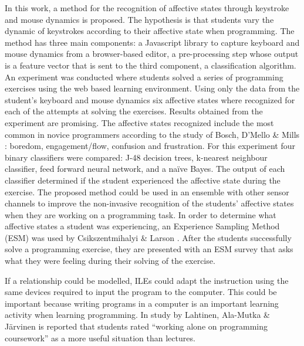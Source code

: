 \documentclass[conference]{IEEEtran}
\begin{document}
In this work, a method for the recognition of affective states through keystroke
and mouse dynamics is proposed. The hypothesis is that students vary the dynamic
of keystrokes according to their affective state when programming. 
 The method
has three main components: a Javascript library to capture keyboard and mouse
dynamics from a browser-based editor, a pre-processing step whose output is a
feature vector that is sent to the third component, a classification algorithm.
An experiment was conducted where students solved a series of programming
exercises using the web based learning environment. Using only the data from the
student’s keyboard and mouse dynamics six affective states where recognized for
each of the attempts at solving the exercises. Results obtained from the
experiment are promising. The affective states recognized include the most
common in novice programmers according to the study of Bosch, D'Mello \& Mills
\cite{bixler2013detecting}: boredom, engagement/flow, confusion and frustration. For this experiment
four binary classifiers were compared: J-48 decision trees, k-nearest neighbour
classifier, feed forward neural network, and a na\"ive Bayes. The output of each
classifier determined if the student experienced the affective state during the
exercise. The proposed method could be used in an ensemble with other sensor
channels to improve the non-invasive recognition of the students’ affective
states when they are working on a programming task. In order to determine what
affective states a student was experiencing, an Experience Sampling Method (ESM)
was used by Csikszentmihalyi \& Larson \cite{kubey1996experience}. After the students successfully
solve a programming exercise, they are presented with an ESM survey that asks
what they were feeling during their solving of the exercise.

If a relationship could be modelled, ILEs could adapt the instruction using the
same devices required to input the program to the computer. This could be
important because writing programs in a computer is an important learning
activity when learning programming. In study by Lahtinen, Ala-Mutka \& Järvinen
\cite{lahtinen2005study} is reported that students rated ``working alone on programming
coursework'' as a more useful situation than lectures.
\end{document}
